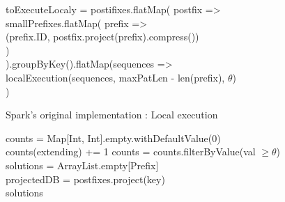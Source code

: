 \documentclass{eplmastersthesis}
\begin{document}
\begin{algorithm}[h]
{{{{				} 
			}
		}
		 {
			toExecuteLocaly = postifixes.flatMap( postfix => \\
				\Indp
				smallPrefixes.flatMap( prefix => \\
					\Indp
					(prefix.ID, postfix.project(prefix).compress())\\
					\Indm
				)\\
				\Indm
			).groupByKey().flatMap(sequences => \\
				\Indp
				localExecution(sequences, maxPatLen - len(prefix), $\theta$) \\
				\Indm
			) \\
		}
   	}
\end{algorithm}

\LinesNumbered
\begin{algorithm}[h]
	\caption{Spark's original implementation : Local execution}
    \label{alg:SPARK3}
    
    
   	 {
   		counts = Map[Int, Int].empty.withDefaultValue(0) \\
		 {
			 {
				counts(extending) += 1
			}
		}
		counts = counts.filterByValue(val $\geq \theta$) \\
		solutions = ArrayList.empty[Prefix] \\
		 {
			projectedDB = postfixes.project(key)\\
		}
		\Return solutions
   	}
\end{algorithm}
\end{document}
